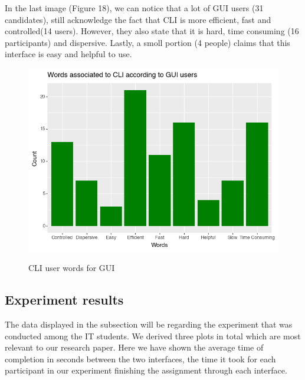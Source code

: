 \documentclass[]{report}
\begin{document}
	In the last image (Figure 18), we can notice that a lot of GUI users (31 candidates), still acknowledge the fact that CLI is more efficient, fast and controlled(14 users). However, they also state that it is hard, time consuming (16 participants) and dispersive. Lastly, a smoll portion (4 people) claims that this interface is easy and helpful to use.
	
	
	\begin{figure}[H]
		\centering
		\includegraphics[width=0.75\linewidth]{WordsCLIFromGUI}\\
		\caption{CLI user words for GUI}
		\label{fig: 18}
	\end{figure}
\newpage
\subsection{Experiment results}
The data displayed in the subsection will be regarding the experiment that was conducted among the IT students. We derived three plots in total which are most relevant to our research paper. Here we have shown the average time of completion in seconds between the two interfaces, the time it took for each participant in our experiment finishing the assignment through each interface.\\
		
\end{document}
